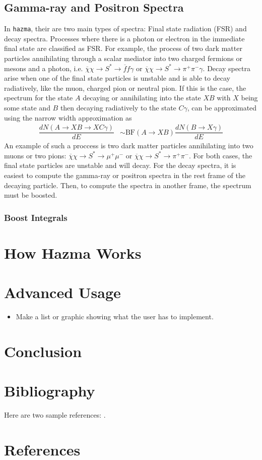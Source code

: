 \documentclass[review]{elsarticle}
\begin{document}
\subsection{Gamma-ray and Positron Spectra}
In \texttt{hazma}, their are two main types of spectra: Final state radiation (FSR) and decay spectra. Processes where there is a photon or electron in the immediate final state are classified as FSR. For example, the process of two dark matter particles annihilating through a scalar mediator into two charged fermions or mesons and a photon, i.e. \(\overline{\chi}\chi\to S^{*}\to\overline{f}f\gamma\) or \(\overline{\chi}\chi\to S^{*}\to\pi^{+}\pi^{-}\gamma\). Decay spectra arise when one of the final state particles is unstable and is able to decay radiatively, like the muon, charged pion or neutral pion. If this is the case, the spectrum for the state \(A\) decaying or annihilating into the state \(XB\) with \(X\) being some state and \(B\) then decaying radiatively to the state \(C\gamma\), can be approximated using the narrow width approximation as
\begin{align}
	\dfrac{dN(A\to XB\to XC\gamma)}{dE} & \sim \mathrm{BF}(A\to XB)\dfrac{dN(B\to X\gamma)}{dE}
\end{align}
An example of such a proccess is two dark matter particles annihilating into two muons or two pions: \(\overline{\chi}\chi\to S^{*}\to\mu^{+}\mu^{-}\) or \(\overline{\chi}\chi\to S^{*}\to\pi^{+}\pi^{-}\). For both cases, the final state particles are unstable and will decay. For the decay spectra, it is easiest to compute the gamma-ray or positron spectra in the rest frame of the decaying particle. Then, to compute the spectra in another frame, the spectrum must be boosted.
\subsubsection{Boost Integrals}


\section{How Hazma Works}%
\label{sec:how_hazma_works}

\section{Advanced Usage}%
\label{sec:advanced_usage}

\begin{itemize}
    \item Make a list or graphic showing what the user has to implement.
\end{itemize}

\section{Conclusion}%
\label{sec:conclusion}


\section{Bibliography}

Here are two sample references: \cite{Feynman1963118,Dirac1953888}.

\section*{References}


\end{document}
